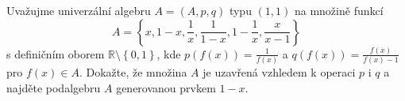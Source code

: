 Uvažujme univerzální algebru $A=(A,p,q)$ typu $(1,1)$ na množině funkcí 
$$A=\left \{ x,1-x,\frac{1}{x},\frac{1}{1-x},1-\frac{1}{x},\frac{x}{x-1} \right \}$$ 
s definičním oborem $\mathbb{R} \setminus \left \{ 0,1 \right \}$, kde
$p(f(x))=\frac{1}{f(x)}$ a $q(f(x))=\frac{f(x)}{f(x)-1}$ pro $f(x) \in A$.
Dokažte, že množina $A$ je uzavřená vzhledem k operaci $p$ i $q$ a najděte
podalgebru $A$ generovanou prvkem $1-x$.

